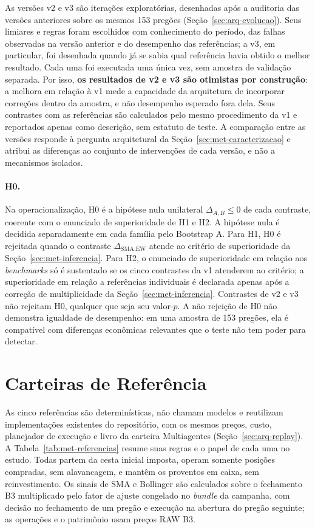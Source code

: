 As versões v2 e v3 são iterações exploratórias, desenhadas após a auditoria das versões anteriores sobre os mesmos 153 pregões (Seção~\ref{sec:arq-evolucao}). Seus limiares e regras foram escolhidos com conhecimento do período, das falhas observadas na versão anterior e do desempenho das referências; a v3, em particular, foi desenhada quando já se sabia qual referência havia obtido o melhor resultado. Cada uma foi executada uma única vez, sem amostra de validação separada. Por isso, \textbf{os resultados de v2 e v3 são otimistas por construção}: a melhora em relação à v1 mede a capacidade da arquitetura de incorporar correções dentro da amostra, e não desempenho esperado fora dela. Seus contrastes com as referências são calculados pelo mesmo procedimento da v1 e reportados apenas como descrição, sem estatuto de teste. A comparação entre as versões responde à pergunta arquitetural da Seção~\ref{sec:met-caracterizacao} e atribui as diferenças ao conjunto de intervenções de cada versão, e não a mecanismos isolados.

\paragraph*{H0.} Na operacionalização, H0 é a hipótese nula unilateral $\Delta_{A,B} \leq 0$ de cada contraste, coerente com o enunciado de superioridade de H1 e H2. A hipótese nula é decidida separadamente em cada família pelo Bootstrap A. Para H1, H0 é rejeitada quando o contraste $\Delta_{\text{SMA},\text{EW}}$ atende ao critério de superioridade da Seção~\ref{sec:met-inferencia}. Para H2, o enunciado de superioridade em relação aos \textit{benchmarks} só é sustentado se os cinco contrastes da v1 atenderem ao critério; a superioridade em relação a referências individuais é declarada apenas após a correção de multiplicidade da Seção~\ref{sec:met-inferencia}. Contrastes de v2 e v3 não rejeitam H0, qualquer que seja seu valor-$p$. A não rejeição de H0 não demonstra igualdade de desempenho: em uma amostra de 153 pregões, ela é compatível com diferenças econômicas relevantes que o teste não tem poder para detectar.

\section{Carteiras de Referência}
\label{sec:met-referencias}

As cinco referências são determinísticas, não chamam modelos e reutilizam implementações existentes do repositório, com os mesmos preços, custo, planejador de execução e livro da carteira Multiagentes (Seção~\ref{sec:arq-replay}). A Tabela~\ref{tab:met-referencias} resume suas regras e o papel de cada uma no estudo. Todas partem da cesta inicial imposta, operam somente posições compradas, sem alavancagem, e mantêm os proventos em caixa, sem reinvestimento. Os sinais de SMA e Bollinger são calculados sobre o fechamento B3 multiplicado pelo fator de ajuste congelado no \textit{bundle} da campanha, com decisão no fechamento de um pregão e execução na abertura do pregão seguinte; as operações e o patrimônio usam preços RAW B3.

